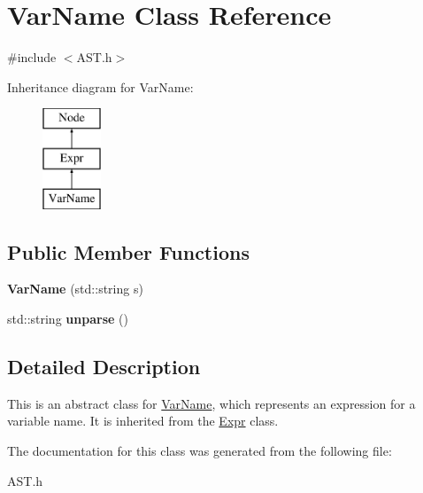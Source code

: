 \hypertarget{class_var_name}{}\section{Var\+Name Class Reference}
\label{class_var_name}


{\ttfamily \#include $<$A\+S\+T.\+h$>$}

Inheritance diagram for Var\+Name\+:\begin{figure}[H]
\begin{center}
\leavevmode
\includegraphics[height=3.000000cm]{class_var_name}
\end{center}
\end{figure}
\subsection*{Public Member Functions}
\begin{DoxyCompactItemize}
\item 
\hypertarget{class_var_name_a94e47b4840fe64470bfebf6fd32557f4}{}{\bfseries Var\+Name} (std\+::string s)\label{class_var_name_a94e47b4840fe64470bfebf6fd32557f4}

\item 
\hypertarget{class_var_name_af29612051468cad25343614de9bb067f}{}std\+::string {\bfseries unparse} ()\label{class_var_name_af29612051468cad25343614de9bb067f}

\end{DoxyCompactItemize}


\subsection{Detailed Description}
This is an abstract class for \hyperlink{class_var_name}{Var\+Name}, which represents an expression for a variable name. It is inherited from the \hyperlink{class_expr}{Expr} class. 

The documentation for this class was generated from the following file\+:\begin{DoxyCompactItemize}
\item 
A\+S\+T.\+h\end{DoxyCompactItemize}

